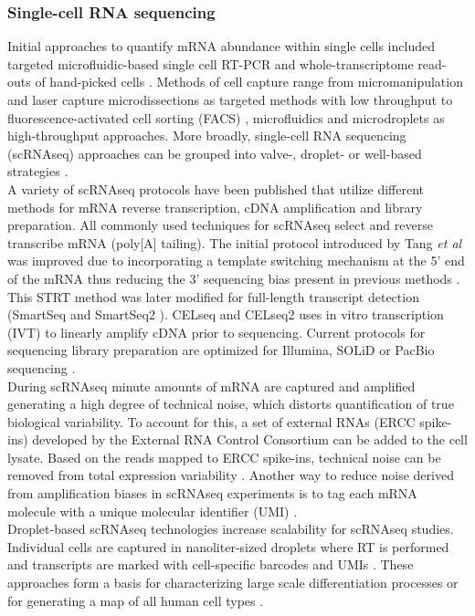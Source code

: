 \subsubsection{Single-cell RNA sequencing}

Initial approaches to quantify mRNA abundance within single cells included targeted microfluidic-based single cell RT-PCR \citep{Warren2006} and whole-transcriptome read-outs of hand-picked cells \citep{Tang2009}. Methods of cell capture range from micromanipulation \citep{Grindberg2014} and laser capture microdissections \citep{Frumkin2008} as targeted methods with low throughput to  fluorescence-activated cell sorting (FACS) \citep{Hayashi2010, Dalerba2011, Jaitin2014}, microfluidics \citep{Trapnell2014, Treutlein2014} and microdroplets \citep{Klein2015, Macosko2015} as high-throughput approaches. More broadly, single-cell RNA sequencing (scRNAseq) approaches can be grouped into valve-, droplet- or well-based strategies \citep{Prakadan2017}.\\
A variety of scRNAseq protocols have been published that utilize different methods for mRNA reverse transcription, cDNA amplification and library preparation. All commonly used techniques for scRNAseq select and reverse transcribe mRNA (poly[A] tailing). The initial protocol introduced by Tang \textit{et al} \citep{Tang2009} was improved due to incorporating a template switching mechanism at the 5' end of the mRNA thus reducing the 3' sequencing bias present in previous methods \citep{Islam2011}. This STRT method was later modified for full-length transcript detection (SmartSeq \citep{Ramskold2012} and SmartSeq2 \citep{Picelli2013}). CELseq \citep{Hashimshony2012} and CELseq2 \citep{Hashimshony2016} uses in vitro transcription (IVT) to linearly amplify cDNA prior to sequencing. Current protocols for sequencing library preparation are optimized for Illumina, SOLiD or PacBio sequencing \citep{Kolodziejczyk2015review}. \\
During scRNAseq minute amounts of mRNA are captured and amplified generating a high degree of technical noise, which distorts quantification of true biological variability. To account for this, a set of external RNAs (ERCC spike-ins) developed by the External RNA Control Consortium \citep{Rna2005} can be added to the cell lysate. Based on the reads mapped to ERCC spike-ins, technical noise can be removed from total expression variability \citep{Brennecke2013, Vallejos2015BASiCS}. Another way to reduce noise derived from amplification biases in scRNAseq experiments is to tag each mRNA molecule with a unique molecular identifier (UMI) \citep{Kivioja2011, Islam2014}.\\ 
Droplet-based scRNAseq technologies increase scalability for scRNAseq studies. Individual cells are captured in nanoliter-sized droplets where RT is performed and transcripts are marked with cell-specific barcodes and UMIs \citep{Klein2015, Macosko2015}. These approaches form a basis for characterizing large scale differentiation processes \citep{Ibarra-Soria2018a} or for generating a map of all human cell types \citep{Regev2017}.

